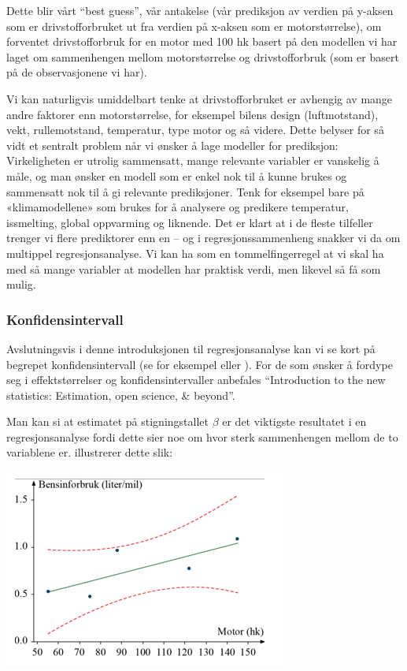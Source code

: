 \documentclass[
]{article}
\begin{document}
Dette blir vårt ``best guess'', vår antakelse (vår prediksjon av verdien på y-aksen som er drivstofforbruket ut fra verdien på x-aksen som er motorstørrelse), om forventet drivstofforbruk for en motor med 100 hk basert på den modellen vi har laget om sammenhengen mellom motorstørrelse og drivstofforbruk (som er basert på de observasjonene vi har).

Vi kan naturligvis umiddelbart tenke at drivstofforbruket er avhengig av mange andre faktorer enn motorstørrelse, for eksempel bilens design (luftmotstand), vekt, rullemotstand, temperatur, type motor og så videre. Dette belyser for så vidt et sentralt problem når vi ønsker å lage modeller for prediksjon: Virkeligheten er utrolig sammensatt, mange relevante variabler er vanskelig å måle, og man ønsker en modell som er enkel nok til å kunne brukes og sammensatt nok til å gi relevante prediksjoner. Tenk for eksempel bare på «klimamodellene» som brukes for å analysere og predikere temperatur, issmelting, global oppvarming og liknende. Det er klart at i de fleste tilfeller trenger vi flere prediktorer enn en -- og i regresjonssammenheng snakker vi da om multippel regresjonsanalyse. Vi kan ha som en tommelfingerregel at vi skal ha med så mange variabler at modellen har praktisk verdi, men likevel så få som mulig.

\hypertarget{konfidensintervall}{%
\subsubsection{Konfidensintervall}\label{konfidensintervall}}

Avslutningsvis i denne introduksjonen til regresjonsanalyse kan vi se kort på begrepet konfidensintervall (se for eksempel \citet{lovasStatistikkUniversiteterOg2013} eller \citet{hinkleAppliedStatisticsBehavioral2003}). For de som ønsker å fordype seg i effektstørrelser og konfidensintervaller anbefales \citet{cummingIntroductionNewStatistics2017} ``Introduction to the new statistics: Estimation, open science, \& beyond''.

Man kan si at estimatet på stigningstallet \(\beta\) er det viktigste resultatet i en regresjonsanalyse fordi dette sier noe om hvor sterk sammenhengen mellom de to variablene er. \citet{lovasStatistikkUniversiteterOg2013} illustrerer dette slik:

\includegraphics{Teori_fig5.png}
\end{document}
